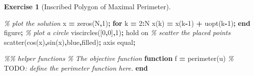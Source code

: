 \documentclass[
]{book}
\newenvironment{Shaded}{\begin{snugshade}}{\end{snugshade}}
\newcommand{\AlertTok}[1]{\textcolor[rgb]{0.94,0.16,0.16}{#1}}
\newcommand{\CommentTok}[1]{\textcolor[rgb]{0.56,0.35,0.01}{\textit{#1}}}
\newcommand{\FloatTok}[1]{\textcolor[rgb]{0.00,0.00,0.81}{#1}}
\newcommand{\KeywordTok}[1]{\textcolor[rgb]{0.13,0.29,0.53}{\textbf{#1}}}
\newcommand{\NormalTok}[1]{#1}
\newcommand{\OperatorTok}[1]{\textcolor[rgb]{0.81,0.36,0.00}{\textbf{#1}}}
\newcommand{\SpecialStringTok}[1]{\textcolor[rgb]{0.31,0.60,0.02}{#1}}
\newcommand{\VariableTok}[1]{\textcolor[rgb]{0.00,0.00,0.00}{#1}}
\theoremstyle{definition}
\theoremstyle{definition}
\theoremstyle{definition}
\newtheorem{exercise}{Exercise}[chapter]
\theoremstyle{definition}
\theoremstyle{remark}
\begin{document}
\begin{exercise}[Inscribed Polygon of Maximal Perimeter]
\begin{Shaded}
\begin{Highlighting}[]
\CommentTok{\% plot the solution}
\VariableTok{x} \OperatorTok{=} \VariableTok{zeros}\NormalTok{(}\VariableTok{N}\OperatorTok{,}\FloatTok{1}\NormalTok{)}\OperatorTok{;}
\KeywordTok{for} \VariableTok{k} \OperatorTok{=} \FloatTok{2}\OperatorTok{:}\VariableTok{N}
    \VariableTok{x}\NormalTok{(}\VariableTok{k}\NormalTok{) }\OperatorTok{=} \VariableTok{x}\NormalTok{(}\VariableTok{k}\OperatorTok{{-}}\FloatTok{1}\NormalTok{) }\OperatorTok{+} \VariableTok{uopt}\NormalTok{(}\VariableTok{k}\OperatorTok{{-}}\FloatTok{1}\NormalTok{)}\OperatorTok{;}
\KeywordTok{end}
\VariableTok{figure}\OperatorTok{;}
\CommentTok{\% plot a circle}
\VariableTok{viscircles}\NormalTok{([}\FloatTok{0}\OperatorTok{,}\FloatTok{0}\NormalTok{]}\OperatorTok{,}\FloatTok{1}\NormalTok{)}\OperatorTok{;}
\VariableTok{hold} \VariableTok{on}
\CommentTok{\% scatter the placed points}
\VariableTok{scatter}\NormalTok{(}\VariableTok{cos}\NormalTok{(}\VariableTok{x}\NormalTok{)}\OperatorTok{,}\VariableTok{sin}\NormalTok{(}\VariableTok{x}\NormalTok{)}\OperatorTok{,}\SpecialStringTok{\textquotesingle{}blue\textquotesingle{}}\OperatorTok{,}\SpecialStringTok{\textquotesingle{}filled\textquotesingle{}}\NormalTok{)}\OperatorTok{;}
\VariableTok{axis} \VariableTok{equal}\OperatorTok{;}

\CommentTok{\%\% helper functions}
\CommentTok{\% The objective function}
\KeywordTok{function} \VariableTok{f} \OperatorTok{=} \VariableTok{perimeter}\NormalTok{(}\VariableTok{u}\NormalTok{)}
\CommentTok{\% }\AlertTok{TODO}\CommentTok{: define the perimeter function here.}
\KeywordTok{end}
\end{Highlighting}
\end{Shaded}

\end{exercise}

~
\end{document}
